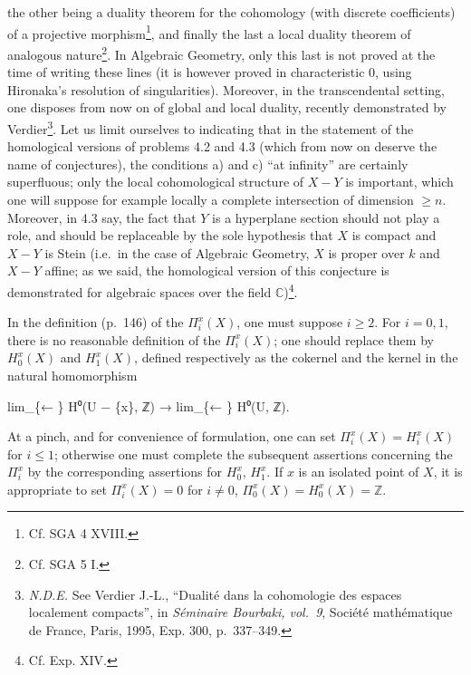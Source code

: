\documentclass[
]{article}
\newenvironment{Shaded}{}{}
\newcommand{\NormalTok}[1]{#1}
\begin{document}
the other being a duality theorem for the cohomology (with discrete
coefficients) of a projective morphism\footnote{Cf. SGA 4 XVIII.}, and
finally the last a local duality theorem of analogous nature\footnote{Cf.
  SGA 5 I.}. In Algebraic Geometry, only this last is not proved at the
time of writing these lines (it is however proved in characteristic 0,
using Hironaka's resolution of singularities). Moreover, in the
transcendental setting, one disposes from now on of global and local
duality, recently demonstrated by Verdier\footnote{\emph{N.D.E.} See
  Verdier J.-L., ``Dualité dans la cohomologie des espaces localement
  compacts'', in \emph{Séminaire Bourbaki, vol.~9}, Société mathématique
  de France, Paris, 1995, Exp. 300, p.~337--349.}. Let us limit
ourselves to indicating that in the statement of the homological
versions of problems 4.2 and 4.3 (which from now on deserve the name of
conjectures), the conditions a) and c) ``at infinity'' are certainly
superfluous; only the local cohomological structure of \(X - Y\) is
important, which one will suppose for example locally a complete
intersection of dimension \(\geqslant n\). Moreover, in 4.3 say, the
fact that \(Y\) is a hyperplane section should not play a role, and
should be replaceable by the sole hypothesis that \(X\) is compact and
\(X - Y\) is Stein (i.e.~in the case of Algebraic Geometry, \(X\) is
proper over \(k\) and \(X - Y\) affine; as we said, the homological
version of this conjecture is demonstrated for algebraic spaces over the
field \(\mathbb{C}\))\footnote{Cf. Exp. XIV.}.

In the definition (p.~146) of the \(\Pi^{x}_{i}(X)\), one must suppose
\(i \geqslant 2\). For \(i = 0, 1\), there is no reasonable definition
of the \(\Pi^{x}_{i}(X)\); one should replace them by \(H^{x}_{0}(X)\)
and \(H^{x}_{1}(X)\), defined respectively as the cokernel and the
kernel in the natural homomorphism

\begin{Shaded}
\begin{Highlighting}[]
\NormalTok{lim\_\{← \} H⁰(U − \{x\}, ℤ) → lim\_\{← \} H⁰(U, ℤ).}
\end{Highlighting}
\end{Shaded}

At a pinch, and for convenience of formulation, one can set
\(\Pi^{x}_{i}(X) = H^{x}_{i}(X)\) for \(i \leqslant 1\); otherwise one
must complete the subsequent assertions concerning the \(\Pi^{x}_{i}\)
by the corresponding assertions for \(H^{x}_{0}\), \(H^{x}_{1}\). If
\(x\) is an isolated point of \(X\), it is appropriate to set
\(\Pi^{x}_{i}(X) = 0\) for \(i \neq 0\),
\(\Pi^{x}_{0}(X) = H^{x}_{0}(X) = \mathbb{Z}\).
\end{document}
